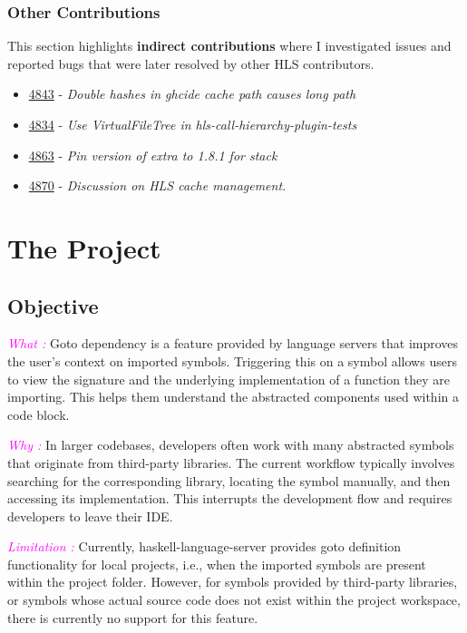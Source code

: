 \documentclass[a4paper,12pt]{article}
\newcommand{\pull}[1]{\href{https://github.com/haskell/haskell-language-server/pull/#1}{#1}}
\newcommand{\issue}[1]{\href{https://github.com/haskell/haskell-language-server/issues/#1}{#1}}
\begin{document}
\subsubsection*{Other Contributions}
This section highlights \textbf{indirect contributions} where I investigated issues and reported bugs that were later resolved by other HLS contributors.
\vspace{0.3em}

\begin{itemize}
  \item \issue{4843} - \textit{Double hashes in ghcide cache path causes long path}
  \item \pull{4834} - \textit{Use VirtualFileTree in hls-call-hierarchy-plugin-tests}
  \item \pull{4863} - \textit{Pin version of extra to 1.8.1 for stack}
  \item \issue{4870} - \textit{Discussion on HLS cache management.}

\end{itemize}

\section{The Project}
\subsection{Objective}

\textcolor{magenta}{\textit{What :}} Goto dependency is a feature provided by language servers that improves the user's context on imported symbols. Triggering this on a symbol allows users to view the signature and the underlying implementation of a function they are importing. This helps them understand the abstracted components used within a code block.
\vspace{0.6em}

\textcolor{magenta}{\textit{Why : }} In larger codebases, developers often work with many abstracted symbols that originate from third-party libraries. The current workflow typically involves searching for the corresponding library, locating the symbol manually, and then accessing its implementation. This interrupts the development flow and requires developers to leave their IDE.
\vspace{0.6em}

\textcolor{magenta}{\textit{Limitation :  }} Currently, haskell-language-server provides goto definition functionality for local projects, i.e., when the imported symbols are present within the project folder. However, for symbols provided by third-party libraries, or symbols whose actual source code does not exist within the project workspace, there is currently no support for this feature.
\vspace{0.6em}
\end{document}
